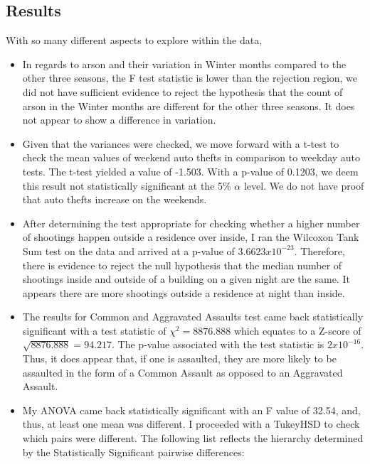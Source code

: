 \documentclass{article}
\begin{document}
\subsection*{Results}
With so many different aspects to explore within the data, 
\begin{itemize}
\item In regards to arson and their variation in Winter months compared to the other three seasons, the F test statistic is lower than the rejection region, we did not have sufficient evidence to reject the hypothesis that the count of arson in the Winter months are different for the other three seasons.  It does not appear to show a difference in variation.

\item Given that the variances were checked, we move forward with a t-test to check the mean values of weekend auto thefts in comparison to weekday auto tests.  The t-test yielded a value of -1.503.  With a p-value of 0.1203, we deem this result not statistically significant at the 5\% $\alpha$ level.  We do not have proof that auto thefts increase on the weekends. 

\item After determining the test appropriate for checking whether a higher number of shootings happen outside a residence over inside, I ran the Wilcoxon Tank Sum test on the data and arrived at a p-value of $3.6623x10^{-23}$.  Therefore, there is evidence to reject the null hypothesis that the median number of shootings inside and outside of a building on a given night are the same.  It appears there are more shootings outside a residence at night than inside.   

\item The results for Common and Aggravated Assaults test came back statistically significant with a test statistic of $\chi^{2} = 8876.888$ which equates to a Z-score of $\sqrt{8876.888} = 94.217$.  The p-value associated with the test statistic is $2x10^{-16}$.  Thus, it does appear that, if one is assaulted, they are more likely to be assaulted in the form of a Common Assault as opposed to an Aggravated Assault.  

\item  My ANOVA came back statistically significant with an F value of 32.54, and, thus, at least one mean was different.  I proceeded with a TukeyHSD to check which pairs were different.  The following list reflects the hierarchy determined by the Statistically Significant pairwise differences: 
\end{itemize}
\end{document}
